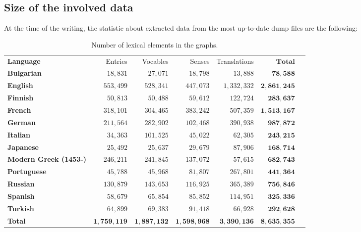 \documentclass[10pt, a4paper]{article}
\begin{document}
\subsection{Size of the involved data}

At the time of the writing, the statistic about extracted data from the most up-to-date dump files are the following:

\begin{table}[htb]
\begin{minipage}{\linewidth}
\begin{small}
\begin{tabular}{lrrrrrr}
\hline
\textbf{Language} & Entries & Vocables & Senses & Translations & $\mathbf{Total}$ \\
\textbf{Bulgarian} & $18,831$ & $27,071$ & $18,798$ & $13,888$ & $\mathbf{78,588}$ \\
\textbf{English} & $553,499$ & $528,341$ & $447,073$ & $1,332,332$ & $\mathbf{2,861,245}$ \\
\textbf{Finnish} & $50,813$ & $50,488$ & $59,612$ & $122,724$ & $\mathbf{283,637}$ \\
\textbf{French} & $318,101$ & $304,465$ & $383,242$ & $507,359$ & $\mathbf{1,513,167}$ \\
\textbf{German} & $211,564$ & $282,902$ & $102,468$ & $390,938$ & $\mathbf{987,872}$ \\
\textbf{Italian} & $34,363$ & $101,525$ & $45,022$ & $62,305$ & $\mathbf{243,215}$ \\
\textbf{Japanese} & $25,492$ & $25,637$ & $29,679$ & $87,906$ & $\mathbf{168,714}$ \\
\textbf{Modern Greek (1453-)} & $246,211$ & $241,845$ & $137,072$ & $57,615$ & $\mathbf{682,743}$ \\
\textbf{Portuguese} & $45,788$ & $45,968$ & $81,807$ & $267,801$ & $\mathbf{441,364}$ \\
\textbf{Russian} & $130,879$ & $143,653$ & $116,925$ & $365,389$ & $\mathbf{756,846}$ \\
\textbf{Spanish} & $58,679$ & $65,854$ & $85,852$ & $114,951$ & $\mathbf{325,336}$ \\
\textbf{Turkish} & $64,899$ & $69,383$ & $91,418$ & $66,928$ & $\mathbf{292,628}$ \\
\textbf{Total} & $\mathbf{1,759,119}$ & $\mathbf{1,887,132}$ & $\mathbf{1,598,968}$ & $\mathbf{3,390,136}$ & $\mathbf{8,635,355}$ \\
\end{tabular}
\end{small}
\end{minipage}
\caption{Number of lexical elements in the graphs.}
\label{table:size}
\end{table}
\end{document}

